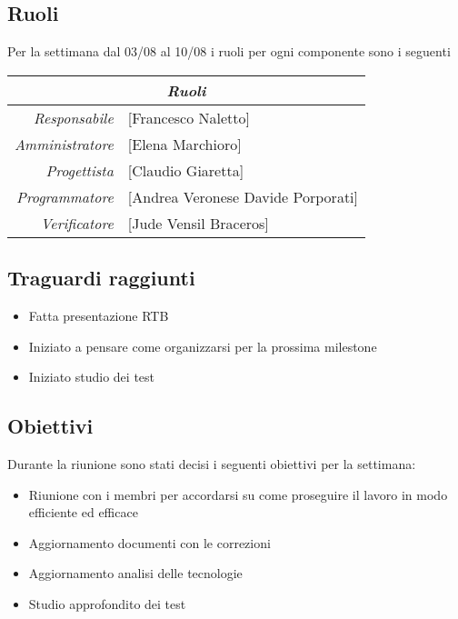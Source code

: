 \documentclass[12pt]{article}
\begin{document}
\subsection{Ruoli}
Per la settimana dal 03/08 al 10/08 i ruoli per ogni componente sono i seguenti
\\
\begin{tabular}{r | l}
    \multicolumn{2}{c}{\textit{Ruoli}}\\
    \hline
    \textit{Responsabile} &
    [Francesco Naletto]\makecell{}\\
    \textit{Amministratore} &
    [Elena Marchioro]\makecell{}\\
    \textit{Progettista} &
    [Claudio Giaretta]\makecell{}\\
    \textit{Programmatore} &
    [Andrea Veronese Davide Porporati]\makecell{}\\
    \textit{Verificatore} & 
    [Jude Vensil Braceros]\makecell{}\\
\end{tabular}

\subsection{Traguardi raggiunti}
\begin{itemize}
    \item Fatta presentazione RTB
    \item Iniziato a pensare come organizzarsi per la prossima milestone
    \item Iniziato studio dei test
    
    
\end{itemize}

\subsection{Obiettivi}
Durante la riunione sono stati decisi i seguenti obiettivi per la settimana:
\begin{itemize}
    \item Riunione con i membri per accordarsi su come proseguire il lavoro in modo efficiente ed efficace
    \item Aggiornamento documenti con le correzioni
    \item Aggiornamento analisi delle tecnologie
    \item Studio approfondito dei test
    

\end{itemize}
\end{document}
